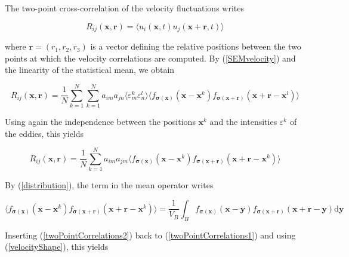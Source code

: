 \noindent The two-point cross-correlation of the velocity fluctuations writes

\begin{equation} \label{twoPointCorrelations0}
R_{ij}(\boldsymbol{x},\boldsymbol{r}) = \langle u_i(\boldsymbol{x},t) u_j(\boldsymbol{x}+\boldsymbol{r},t) \rangle
\end{equation}

\noindent where $\boldsymbol{r} = (r_1,r_2,r_3)$ is a vector defining the relative positions between the two points at which the velocity correlations are computed. By (\ref{SEMvelocity}) and the linearity of the statistical mean, we obtain

\begin{equation}
R_{ij}(\boldsymbol{x},\boldsymbol{r}) = \frac{1}{N}\sum_{k=1}^N\sum_{k=1}^N a_{im}a_{jn} \langle \varepsilon_m^k \varepsilon_n^l \rangle \langle f_{\boldsymbol{\sigma}(\boldsymbol{x})}(\boldsymbol{x}-\boldsymbol{x}^k) f_{\boldsymbol{\sigma}(\boldsymbol{x}+\boldsymbol{r})}(\boldsymbol{x}+\boldsymbol{r}-\boldsymbol{x}^l) \rangle 
\end{equation}

\noindent Using again the independence between the positions $\boldsymbol{x}^k$ and the intensities $\varepsilon^k$ of the eddies, this yields

\begin{equation} \label{twoPointCorrelations1}
R_{ij}(\boldsymbol{x},\boldsymbol{r}) = \frac{1}{N}\sum_{k=1}^N a_{im}a_{jm} \langle f_{\boldsymbol{\sigma}(\boldsymbol{x})}(\boldsymbol{x}-\boldsymbol{x}^k) f_{\boldsymbol{\sigma}(\boldsymbol{x}+\boldsymbol{r})}(\boldsymbol{x}+\boldsymbol{r}-\boldsymbol{x}^k) \rangle 
\end{equation}

\noindent By (\ref{distribution}), the term in the mean operator writes

\begin{equation} \label{twoPointCorrelations2}
\langle f_{\boldsymbol{\sigma}(\boldsymbol{x})}(\boldsymbol{x}-\boldsymbol{x}^k) f_{\boldsymbol{\sigma}(\boldsymbol{x}+\boldsymbol{r})}(\boldsymbol{x}+\boldsymbol{r}-\boldsymbol{x}^k) \rangle = \frac{1}{V_B} \int_B f_{\boldsymbol{\sigma}(\boldsymbol{x})}(\boldsymbol{x}-\boldsymbol{y}) f_{\boldsymbol{\sigma}(\boldsymbol{x}+\boldsymbol{r})}(\boldsymbol{x}+\boldsymbol{r}-\boldsymbol{y}) \mathrm{d}\boldsymbol{y}
\end{equation}

\noindent Inserting (\ref{twoPointCorrelations2}) back to (\ref{twoPointCorrelations1}) and using (\ref{velocityShape}), this yields

